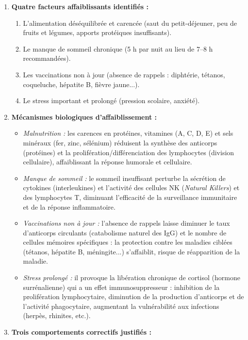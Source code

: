 \documentclass[11pt]{article}
\newcommand{\cle}[1]{{\popxbold\color{popdark}#1}}
\begin{document}
\begin{corrige}
\begin{enumerate}
\item \textbf{Quatre facteurs affaiblissants identifiés :}
\begin{enumerate}
\item L'alimentation déséquilibrée et carencée (saut du petit-déjeuner, peu de fruits et légumes, apports protéiques insuffisants).
\item Le manque de sommeil chronique (5 h par nuit au lieu de 7--8 h recommandées).
\item Les vaccinations non à jour (absence de rappels : diphtérie, tétanos, coqueluche, hépatite B, fièvre jaune...).
\item Le stress important et prolongé (pression scolaire, anxiété).
\end{enumerate}
\item \textbf{Mécanismes biologiques d'affaiblissement :}
\begin{itemize}
\item \emph{Malnutrition :} les carences en \cle{protéines}, \cle{vitamines} (A, C, D, E) et \cle{sels minéraux} (fer, zinc, sélénium) réduisent la synthèse des anticorps (protéines) et la prolifération/différenciation des lymphocytes (division cellulaire), affaiblissant la réponse humorale et cellulaire.
\item \emph{Manque de sommeil :} le sommeil insuffisant perturbe la sécrétion de cytokines (interleukines) et l'activité des cellules NK (\emph{Natural Killers}) et des lymphocytes T, diminuant l'efficacité de la surveillance immunitaire et de la réponse inflammatoire.
\item \emph{Vaccinations non à jour :} l'absence de rappels laisse diminuer le taux d'anticorps circulants (catabolisme naturel des IgG) et le nombre de cellules mémoires spécifiques : la protection contre les maladies ciblées (tétanos, hépatite B, méningite...) s'affaiblit, risque de réapparition de la maladie.
\item \emph{Stress prolongé :} il provoque la libération chronique de \cle{cortisol} (hormone surrénalienne) qui a un effet \cle{immunosuppresseur} : inhibition de la prolifération lymphocytaire, diminution de la production d'anticorps et de l'activité phagocytaire, augmentant la vulnérabilité aux infections (herpès, rhinites, etc.).
\end{itemize}
\item \textbf{Trois comportements correctifs justifiés :}

\end{enumerate}
\end{corrige}
\end{document}
